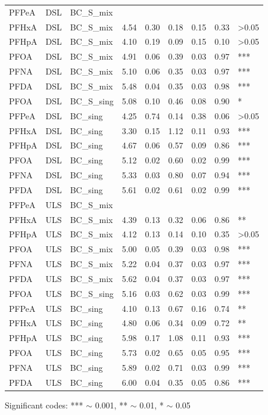 \begin{table}
{\begin{threeparttable}
\begin{tabular}{lllllllll}
\addlinespace
PFPeA & DSL & BC\_S\_mix &  &  &  &  &  &  \\
PFHxA & DSL & BC\_S\_mix & 4.54 & 0.30 & 0.18 & 0.15 & 0.33 & \textgreater{}0.05 \\
PFHpA & DSL & BC\_S\_mix & 4.10 & 0.19 & 0.09 & 0.15 & 0.10 & \textgreater{}0.05 \\
PFOA & DSL & BC\_S\_mix & 4.91 & 0.06 & 0.39 & 0.03 & 0.97 & *** \\
PFNA & DSL & BC\_S\_mix & 5.10 & 0.06 & 0.35 & 0.03 & 0.97 & *** \\
PFDA & DSL & BC\_S\_mix & 5.48 & 0.04 & 0.35 & 0.03 & 0.98 & *** \\
PFOA & DSL & BC\_S\_sing & 5.08 & 0.10 & 0.46 & 0.08 & 0.90 & * \\
PFPeA & DSL & BC\_sing & 4.25 & 0.74 & 0.14 & 0.38 & 0.06 & \textgreater{}0.05 \\
PFHxA & DSL & BC\_sing & 3.30 & 0.15 & 1.12 & 0.11 & 0.93 & *** \\
PFHpA & DSL & BC\_sing & 4.67 & 0.06 & 0.57 & 0.09 & 0.86 & *** \\
PFOA & DSL & BC\_sing & 5.12 & 0.02 & 0.60 & 0.02 & 0.99 & *** \\
PFNA & DSL & BC\_sing & 5.33 & 0.03 & 0.80 & 0.07 & 0.94 & *** \\
PFDA & DSL & BC\_sing & 5.61 & 0.02 & 0.61 & 0.02 & 0.99 & *** \\
\addlinespace 
PFPeA & ULS & BC\_S\_mix &  &  &  &  &  &  \\
PFHxA & ULS & BC\_S\_mix & 4.39 & 0.13 & 0.32 & 0.06 & 0.86 & ** \\
PFHpA & ULS & BC\_S\_mix & 4.12 & 0.13 & 0.14 & 0.10 & 0.35 & \textgreater{}0.05 \\
PFOA & ULS & BC\_S\_mix & 5.00 & 0.05 & 0.39 & 0.03 & 0.98 & *** \\
PFNA & ULS & BC\_S\_mix & 5.22 & 0.04 & 0.37 & 0.03 & 0.97 & *** \\
PFDA & ULS & BC\_S\_mix & 5.62 & 0.04 & 0.37 & 0.03 & 0.97 & *** \\
PFOA & ULS & BC\_S\_sing & 5.16 & 0.03 & 0.62 & 0.03 & 0.99 & *** \\
PFPeA & ULS & BC\_sing & 4.10 & 0.13 & 0.67 & 0.16 & 0.74 & ** \\
PFHxA & ULS & BC\_sing & 4.80 & 0.06 & 0.34 & 0.09 & 0.72 & ** \\
PFHpA & ULS & BC\_sing & 5.98 & 0.17 & 1.08 & 0.11 & 0.93 & *** \\
PFOA & ULS & BC\_sing & 5.73 & 0.02 & 0.65 & 0.05 & 0.95 & *** \\
PFNA & ULS & BC\_sing & 5.89 & 0.02 & 0.71 & 0.03 & 0.99 & *** \\
PFDA & ULS & BC\_sing & 6.00 & 0.04 & 0.35 & 0.05 & 0.86 & *** \\ \bottomrule
\end{tabular}
\begin{tablenotes}
\item Significant codes: *** $\sim$ 0.001, ** $\sim$ 0.01, * $\sim$ 0.05
\end{tablenotes}
\end{threeparttable}}
\end{table}


